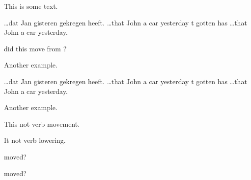 \documentclass{article}
\begin{document}
This is some text.
\begin{subexamples}
	\item\arrowgloss\digloss
	    {\ldots dat Jan  gisteren   gekregen heeft.}
	    {\ldots that John {a \hspace*{1em} car}  yesterday t gotten has}
	    {\ldots that John a car yesterday.}	    
	\item {} did this move from ?
	\item Another example.
		\item\digloss
	    {\ldots dat Jan  gisteren   gekregen heeft.}
	    {\ldots that John {a \hspace*{1em} car}  yesterday t gotten has}
	    {\ldots that John a car yesterday.}
	\item Another example.
\end{subexamples}

\begin{subexamples}
\item This  not  verb movement.
\item It   not  verb lowering.
\arrowstrut
\end{subexamples}
\begin{subexamples}
\item
{}   
moved? 
\item{}   
moved?  
\end{subexamples}
\end{document}
